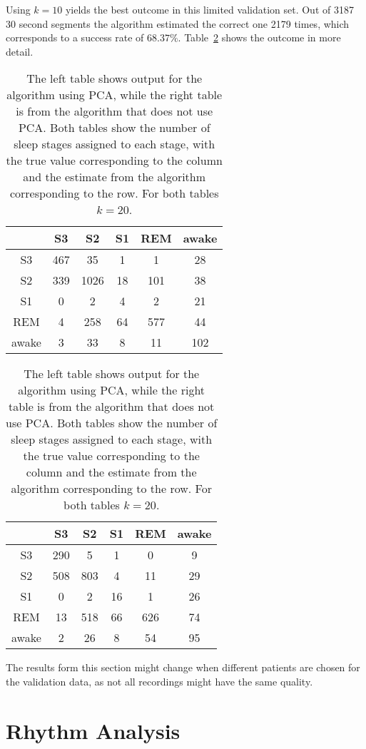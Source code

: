 Using $k=10$ yields the best outcome in this limited validation set. Out of 3187 30 second segments the algorithm estimated the correct one 2179 times, which corresponds to a success rate of $68.37\%$. Table~\ref{tab:error_validation} shows the outcome in more detail.

\begin{table}
	\centering
	\begin{subtable}{0.48\textwidth}
		\begin{tabular}{c|ccccc}
			    & S3  & S2  & S1 & REM & awake \\
			\hline
			S3 & 467  & 35  & 1  & 1  & 28 \\
			S2 & 339  & 1026  & 18  & 101  & 38 \\
			S1 & 0  & 2  & 4  & 2  & 21 \\
			REM & 4  & 258  & 64  & 577  & 44 \\
			awake & 3  & 33  & 8  & 11  & 102 \\
		\end{tabular}
	\end{subtable}
	\hfill
	\begin{subtable}{0.48\textwidth}
		\begin{tabular}{c|ccccc}
			   & S3  & S2  & S1 & REM & awake \\
			\hline
			S3 & 290  & 5  & 1  & 0  & 9 \\
			S2 & 508  & 803  & 4  & 11  & 29 \\
			S1 & 0  & 2  & 16  & 1  & 26 \\
			REM & 13  & 518  & 66  & 626  & 74 \\
			awake & 2  & 26  & 8  & 54  & 95 \\
		\end{tabular}
	\end{subtable}
	
	\caption{The left table shows output for the algorithm using PCA, while the right table is from the algorithm that does not use PCA. Both tables show the number of sleep stages assigned to each stage, with the true value corresponding to the column and the estimate from the algorithm corresponding to the row. For both tables $k=20$.}
	\label{tab:error_validation}
\end{table}

The results form this section might change when different patients are chosen for the validation data, as not all recordings might have the same quality.


\section{Rhythm Analysis}
\label{sec:rhythm_analysis}


